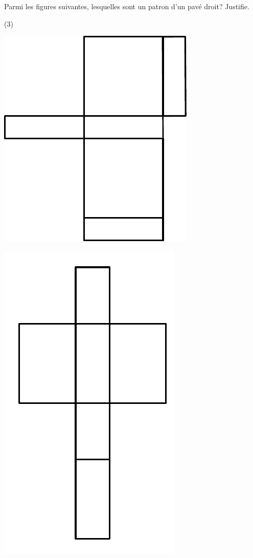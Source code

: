 \documentclass[a4paper,11pt]{report}
\begin{document}
\begin{exop}{
Parmi les figures suivantes, lesquelles sont un patron d'un pavé droit? Justifie.	
\begin{tasks}(3)
		\task

			\includegraphics[scale=0.4]{media/es-20/pl1}
		\task

			\includegraphics[scale=0.4,angle=90]{media/es-20/pl3}
		\task


\end{tasks}}
\end{exop}
\end{document}
